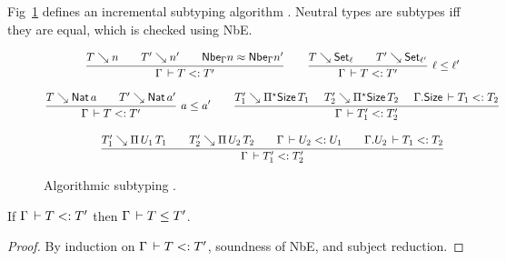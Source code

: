 
Fig~\ref{fig:asub} defines an incremental subtyping algorithm
.
Neutral types are subtypes iff they are equal, which is checked using NbE.
\begin{figure}[htbp]
\hrulefill
\begin{gather*}
  \ru{T \evalsto n \qquad
      T' \evalsto n' \qquad
      \Nbe \Gamma n \nfeq \Nbe \Gamma n'
    }{\Gamma \der T \asub T'}
\qquad
  \rux{T \evalsto \Set[\ell] \qquad
      T' \evalsto \Set[\ell']
    }{\Gamma \der T \asub T'
    }{\ell \leq \ell'}
\\[2ex]
  \rux{T \evalsto \Nat a \qquad
      T' \evalsto \Nat a'
    }{\Gamma \der T \asub T'
    }{a \leq a'}
\qquad
  \ru{T_1' \evalsto \epiT\Size{T_1} \quad \
      T_2' \evalsto \epiT\Size{T_2} \quad \
      \cext \Gamma {\Size} \der T_1 \asub T_2
    }{\Gamma \der T_1' \asub T_2'}
\\[2ex]
  \ru{T_1' \evalsto \piT{U_1}{T_1} \qquad
      T_2' \evalsto \piT{U_2}{T_2} \qquad
      \Gamma \der U_2 \asub U_1 \qquad
      \cext \Gamma {U_2} \der T_1 \asub T_2
    }{\Gamma \der T_1' \asub T_2'}
\end{gather*}
\hrulefill
\caption{Algorithmic subtyping .}
\label{fig:asub}
\end{figure}

\begin{lemma}
  \label{lem:asubsound}
  If\/ $\Gamma \,\vdash T \mathrel{{<}{:}} T'$ then $\Gamma \,\vdash T \leq T'$.
\end{lemma}
\begin{proof}
  By induction on $\Gamma \,\vdash T \mathrel{{<}{:}} T'$, soundness of NbE, and
  subject reduction.
\end{proof}

